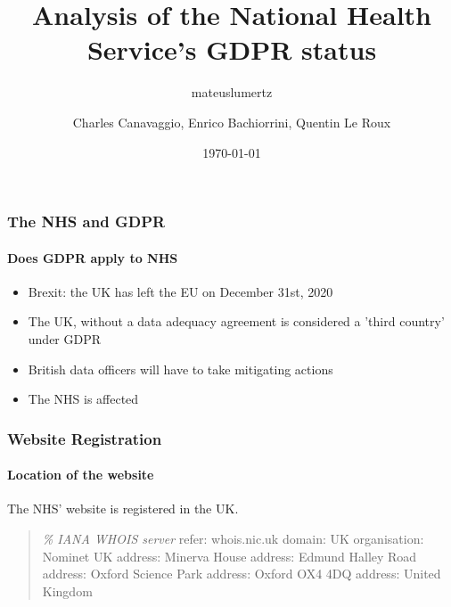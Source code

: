 \documentclass[aspectratio=43]{beamer}
\author{mateuslumertz}
\title[NHS and GDPR]{Analysis of the National Health Service's GDPR status}
\author{Charles Canavaggio, Enrico Bachiorrini, Quentin Le Roux}
\date{\today}
\begin{document}
\begin{frame}[plain]
\maketitle
\end{frame}


\begin{frame}
    \frametitle{The NHS and GDPR}
    \framesubtitle{Does GDPR apply to NHS}
    \begin{itemize}
        \item Brexit: the UK has left the EU on December 31st, 2020\newline
        \item The UK, without a data adequacy agreement is considered a 'third country' under GDPR\newline
        \item British data officers will have to take mitigating actions\newline
        \item The NHS is affected
    \end{itemize}
\end{frame}

\begin{frame}
    \frametitle{Website Registration}
    \framesubtitle{Location of the website}
    The NHS' website is registered in the UK.\newline\newline
    	\begin{quote}
    	\textit{\% IANA WHOIS server}\newline
        refer:        whois.nic.uk\newline
        domain:       UK\newline
        organisation: Nominet UK\newline
        address:      Minerva House\newline
        address:      Edmund Halley Road\newline
        address:      Oxford Science Park\newline
        address:      Oxford  OX4 4DQ\newline
        address:      United Kingdom
        \end{quote}
\end{frame}
\end{document}
